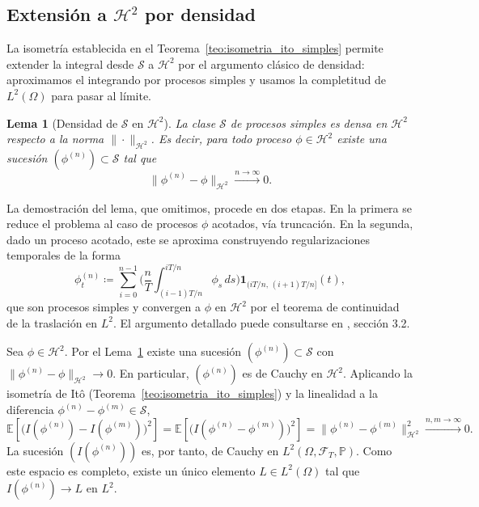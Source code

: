 \documentclass[11pt,a4paper,oneside]{report}
\theoremstyle{plain}
\newtheorem{lema}[teorema]{Lema}
\theoremstyle{definition}
\theoremstyle{remark}
\newcommand{\E}{\mathbb{E}}
\newcommand{\PP}{\mathbb{P}}
\newcommand{\F}{\mathcal{F}}
\newcommand{\1}{\mathbf{1}}
\newcommand{\eqdef}{\coloneqq}
\begin{document}
\subsection{Extensión a $\mathcal{H}^2$ por densidad}
\label{subsec:extension_H2}

La isometría establecida en el Teorema~\ref{teo:isometria_ito_simples}
permite extender la integral desde $\mathcal{S}$ a $\mathcal{H}^2$
por el argumento clásico de densidad: aproximamos el integrando por
procesos simples y usamos la completitud de $L^2(\Omega)$ para pasar
al límite.

\begin{lema}[Densidad de $\mathcal{S}$ en $\mathcal{H}^2$]
\label{lema:densidad_simples}
La clase $\mathcal{S}$ de procesos simples es densa en $\mathcal{H}^2$
respecto a la norma $\|\cdot\|_{\mathcal{H}^2}$. Es decir, para todo
proceso $\phi \in \mathcal{H}^2$ existe una sucesión $(\phi^{(n)}) \subset
\mathcal{S}$ tal que
\begin{equation*}
  \|\phi^{(n)} - \phi\|_{\mathcal{H}^2} \xrightarrow{n \to \infty} 0.
\end{equation*}
\end{lema}

La demostración del lema, que omitimos, procede en dos etapas. En la
primera se reduce el problema al caso de procesos $\phi$ acotados, vía
truncación. En la segunda, dado un proceso acotado, este se aproxima
construyendo regularizaciones temporales de la forma
\begin{equation*}
  \phi^{(n)}_t \eqdef \sum_{i=0}^{n-1}
                       \biggl(\frac{n}{T} \int_{(i-1) T/n}^{i T/n} \phi_s\,
                              ds\biggr)
                       \mathbf{1}_{(i T/n,\, (i+1) T/n]}(t),
\end{equation*}
que son procesos simples y convergen a $\phi$ en $\mathcal{H}^2$ por
el teorema de continuidad de la traslación en $L^2$. El argumento
detallado puede consultarse en
\cite{karatzas-shreve}, sección 3.2.

Sea $\phi \in \mathcal{H}^2$. Por el Lema~\ref{lema:densidad_simples}
existe una sucesión $(\phi^{(n)}) \subset \mathcal{S}$ con
$\|\phi^{(n)} - \phi\|_{\mathcal{H}^2} \to 0$. En particular,
$(\phi^{(n)})$ es de Cauchy en $\mathcal{H}^2$. Aplicando la isometría
de Itô (Teorema~\ref{teo:isometria_ito_simples}) y la linealidad a la
diferencia $\phi^{(n)} - \phi^{(m)} \in \mathcal{S}$,
\begin{equation}\label{eq:cauchy_integral}
  \E\!\left[\bigl(I(\phi^{(n)}) - I(\phi^{(m)})\bigr)^{\!2}\right]
  = \E\!\left[\bigl(I(\phi^{(n)} - \phi^{(m)})\bigr)^{\!2}\right]
  = \|\phi^{(n)} - \phi^{(m)}\|_{\mathcal{H}^2}^2 \xrightarrow{n,m \to \infty} 0.
\end{equation}
La sucesión $(I(\phi^{(n)}))$ es, por tanto, de Cauchy en
$L^2(\Omega, \F_T, \PP)$. Como este espacio es completo, existe un
único elemento $L \in L^2(\Omega)$ tal que $I(\phi^{(n)}) \to L$ en
$L^2$.
\end{document}
